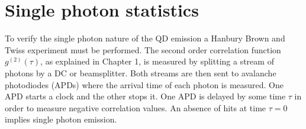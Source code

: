 \section{Single photon statistics}

To verify the single photon nature of the QD emission a Hanbury Brown and Twiss
experiment must be performed. The second order correlation function
$g^{(2)}(\tau)$, as explained in Chapter 1, is measured by splitting a stream of
photons by a DC or beamsplitter. Both streams are then sent to avalanche
photodiodes (APDs) where the arrival time of each photon is measured. One APD
starts a clock and the other stops it. One APD is delayed by some time $\tau$ in
order to measure negative correlation values. An absence of hits at time $\tau =
0$ implies single photon emission.
